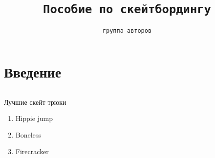 \documentclass[12pt]{article} %
\title{\large{\texttt{Пособие по скейтбордингу}}}
\author{\normalsize{\texttt{группа авторов}}}
\date{\vspace{-5ex}} %
\begin{document}
\maketitle %

\section{Введение} %

\par %
$ $
\[

\]

Лучшие скейт трюки

\begin{enumerate} %

\item Hippie jump
\item Boneless
\item Firecracker
	
\end{enumerate}
\end{document}
